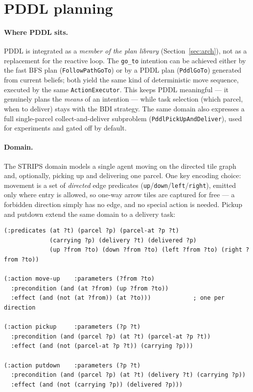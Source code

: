 \section{PDDL planning}
\label{sec:pddl}

\paragraph{Where PDDL sits.} PDDL is integrated as a \emph{member of the plan
library} (Section~\ref{sec:arch}), not as a replacement for the reactive loop.
The \texttt{go\_to} intention can be achieved either by the fast BFS plan
(\texttt{FollowPathGoTo}) or by a PDDL plan (\texttt{PddlGoTo}) generated from
current beliefs; both yield the same kind of deterministic move sequence,
executed by the same \texttt{ActionExecutor}. This keeps PDDL meaningful --- it
genuinely plans the \emph{means} of an intention --- while task selection (which
parcel, when to deliver) stays with the BDI strategy. The same domain also
expresses a full single-parcel collect-and-deliver subproblem
(\texttt{PddlPickUpAndDeliver}), used for experiments and gated off by default.

\paragraph{Domain.} The STRIPS domain models a single agent moving on the
directed tile graph and, optionally, picking up and delivering one parcel. One
key encoding choice: movement is a set of \emph{directed} edge predicates
(\texttt{up}/\texttt{down}/\texttt{left}/\texttt{right}), emitted only where
entry is allowed, so one-way arrow tiles are captured for free --- a forbidden
direction simply has no edge, and no special action is needed. Pickup and
putdown extend the same domain to a delivery task:

\begin{lstlisting}
(:predicates (at ?t) (parcel ?p) (parcel-at ?p ?t)
             (carrying ?p) (delivery ?t) (delivered ?p)
             (up ?from ?to) (down ?from ?to) (left ?from ?to) (right ?from ?to))

(:action move-up    :parameters (?from ?to)
  :precondition (and (at ?from) (up ?from ?to))
  :effect (and (not (at ?from)) (at ?to)))            ; one per direction

(:action pickup     :parameters (?p ?t)
  :precondition (and (parcel ?p) (at ?t) (parcel-at ?p ?t))
  :effect (and (not (parcel-at ?p ?t)) (carrying ?p)))

(:action putdown    :parameters (?p ?t)
  :precondition (and (parcel ?p) (at ?t) (delivery ?t) (carrying ?p))
  :effect (and (not (carrying ?p)) (delivered ?p)))
\end{lstlisting}

